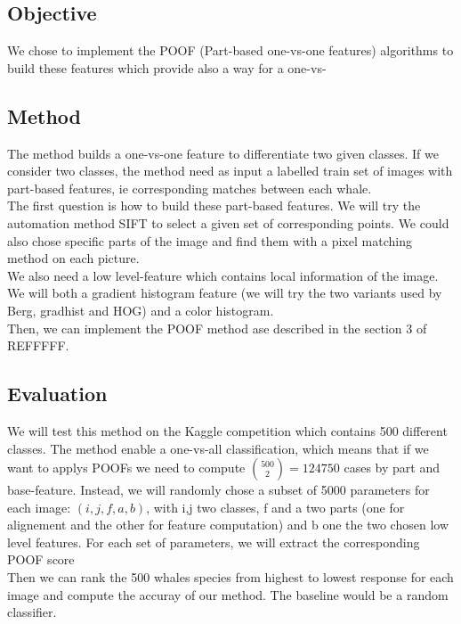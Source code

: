 \documentclass[11pt,a4paper,oneside]{report}
\begin{document}
\subsection*{Objective}

We chose to implement the POOF (Part-based one-vs-one features) algorithms to build these features which provide also a way for a one-vs-

\subsection*{Method}

The method builds a one-vs-one feature to differentiate two given classes.
If we consider two classes, the method need as input a labelled train set of images with part-based features, ie corresponding matches between each whale.\\

The first question is how to build these part-based features. We will try the automation method SIFT to select a given set of corresponding points. We could also chose specific parts of the image and find them with a pixel matching method on each picture.\\

We also need a low level-feature which contains local information of the image. We will both a gradient histogram feature (we will try the two variants used by Berg, gradhist and HOG) and a color histogram.\\

Then, we can implement the POOF method ase described in the section 3 of REFFFFF.

\subsection*{Evaluation}

We will test this method on the Kaggle competition which contains 500 different classes. The method enable a one-vs-all classification, which means that if we want to applys POOFs we need to compute $\binom{500}{2} = 124 750$ cases by part and base-feature. Instead, we will randomly chose a subset of 5000 parameters for each image: $(i,j,f,a,b)$, with i,j two classes, f and a two parts (one for alignement and the other for feature computation) and b one the two chosen low level features. For each set of parameters, we will extract the corresponding POOF score\\

Then we can rank the 500 whales species from highest to lowest response for each image and compute the accuray of our method. The baseline would be a random classifier. 
\end{document}
